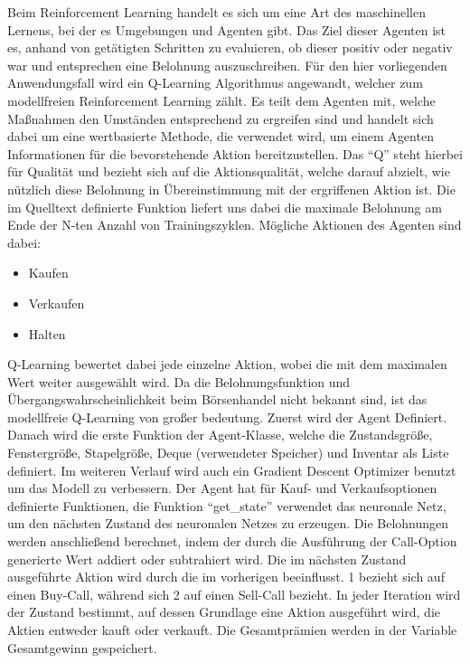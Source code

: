 Beim Reinforcement Learning handelt es sich um eine Art des maschinellen Lernens, bei der es Umgebungen und Agenten gibt. \cite{analyticsvidhya_2021} Das Ziel dieser Agenten ist es, anhand von getätigten Schritten zu evaluieren, ob dieser positiv oder negativ war und entsprechen eine Belohnung auszuschreiben. Für den hier vorliegenden Anwendungsfall wird ein Q-Learning Algorithmus angewandt, welcher zum modellfreien Reinforcement Learning zählt. \cite{analyticsvidhya_2021} Es teilt dem Agenten mit, welche Maßnahmen den Umständen entsprechend zu ergreifen sind und handelt sich dabei um eine wertbasierte Methode, die verwendet wird, um einem Agenten Informationen für die bevorstehende Aktion bereitzustellen. \cite{analyticsvidhya_2021} Das \enquote{Q} steht hierbei für Qualität und bezieht sich auf die Aktionsqualität, welche darauf abzielt, wie nützlich diese Belohnung in Übereinstimmung mit der ergriffenen Aktion ist. \cite{analyticsvidhya_2021} Die im Quelltext definierte Funktion liefert uns dabei die maximale Belohnung am Ende der N-ten Anzahl von Trainingszyklen. Mögliche Aktionen des Agenten sind dabei:
\begin{itemize}
	\item Kaufen
	\item Verkaufen
	\item Halten
\end{itemize}

Q-Learning bewertet dabei jede einzelne Aktion, wobei die mit dem maximalen Wert weiter ausgewählt wird. \cite{analyticsvidhya_2021} Da die Belohnungsfunktion und Übergangswahrscheinlichkeit beim Börsenhandel nicht bekannt sind, ist das modellfreie Q-Learning von großer bedeutung. Zuerst wird der Agent Definiert. Danach wird die erste Funktion der Agent-Klasse, welche die Zustandsgröße, Fenstergröße, Stapelgröße, Deque (verwendeter Speicher) und Inventar als Liste definiert. \cite{analyticsvidhya_2021} Im weiteren Verlauf wird auch ein Gradient Descent Optimizer benutzt um das Modell zu verbessern. Der Agent hat für Kauf- und Verkaufsoptionen definierte Funktionen, die Funktion \enquote{get\_state} verwendet das neuronale Netz, um den nächsten Zustand des neuronalen Netzes zu erzeugen. \cite{analyticsvidhya_2021} Die Belohnungen werden anschließend berechnet, indem der durch die Ausführung der Call-Option generierte Wert addiert oder subtrahiert wird. \cite{analyticsvidhya_2021} Die im nächsten Zustand ausgeführte Aktion wird durch die im vorherigen beeinflusst. \cite{analyticsvidhya_2021} 1 bezieht sich auf einen Buy-Call, während sich 2 auf einen Sell-Call bezieht. \cite{analyticsvidhya_2021} In jeder Iteration wird der Zustand bestimmt, auf dessen Grundlage eine Aktion ausgeführt wird, die Aktien entweder kauft oder verkauft. \cite{analyticsvidhya_2021} Die Gesamtprämien werden in der Variable Gesamtgewinn gespeichert. \cite{analyticsvidhya_2021}

